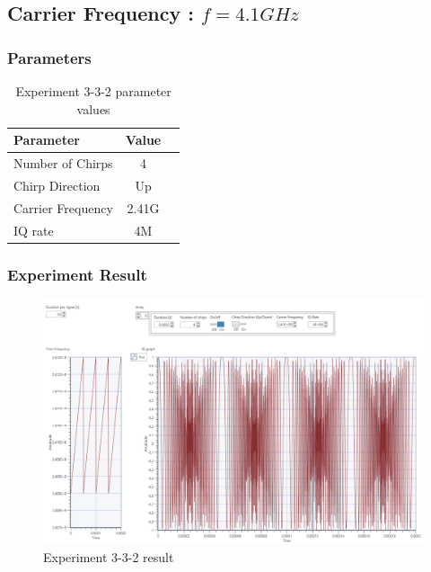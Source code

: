 \subsection{Carrier Frequency : $f = 4.1GHz$}
    \subsubsection*{Parameters}
    \begin{table}[!h]\centering
        \hspace{10mm}
        \begin{tabular}{|l|c|c|}
        \hline
        \multicolumn{1}{|l|}{Parameter} & \multicolumn{1}{l|}{Value} \\
        \hline
        Number of Chirps & 4 \\ 
        \hline
        Chirp Direction & Up \\ 
        \hline
        Carrier Frequency & 2.41G \\ 
        \hline
        IQ rate & 4M \\ 
        \hline
        \end{tabular}
        \caption{Experiment 3-3-2 parameter values}
    \end{table}
\clearpage
    \subsubsection*{Experiment Result}
    \vspace{-4mm}  
    \begin{figure}[!h]\raggedleft
    \hspace{15mm}
		\includegraphics[width=.95\textwidth]{image/week03/3-3-2.png}
		\caption{\footnotesize Experiment 3-3-2 result}
		\vspace{-10pt}
    \end{figure}
    
